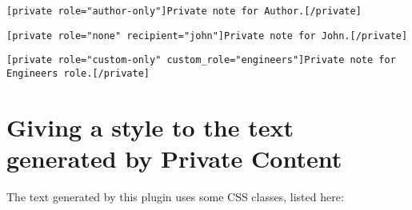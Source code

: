 \begin{lstlisting}
[private role="author-only"]Private note for Author.[/private]
\end{lstlisting}

\begin{lstlisting}
[private role="none" recipient="john"]Private note for John.[/private]
\end{lstlisting}

\begin{lstlisting}
[private role="custom-only" custom_role="engineers"]Private note for Engineers role.[/private]
\end{lstlisting}

\section{Giving a style to the text generated by Private Content}

The text generated by this plugin uses some CSS classes, listed here:

